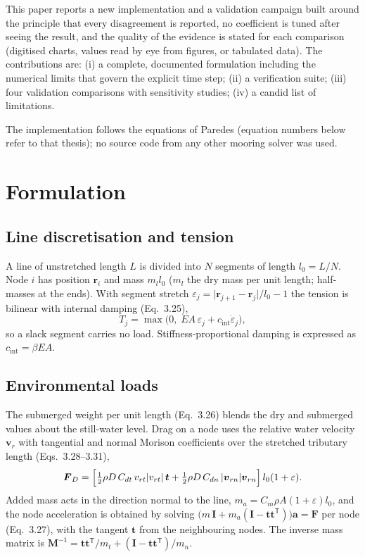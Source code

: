 \documentclass[11pt,a4paper]{article}
\newcommand{\vect}[1]{\boldsymbol{#1}}
\begin{document}
This paper reports a new implementation and a validation campaign built around the principle that every disagreement is reported, no coefficient is tuned after seeing the result, and the quality of the evidence is stated for each comparison (digitised charts, values read by eye from figures, or tabulated data). The contributions are: (i) a complete, documented formulation including the numerical limits that govern the explicit time step; (ii) a verification suite; (iii) four validation comparisons with sensitivity studies; (iv) a candid list of limitations.

The implementation follows the equations of Paredes \cite{paredes2016} (equation numbers below refer to that thesis); no source code from any other mooring solver was used.

\section{Formulation}
\subsection{Line discretisation and tension}
A line of unstretched length $L$ is divided into $N$ segments of length $l_0=L/N$. Node $i$ has position $\vect r_i$ and mass $m_l l_0$ ($m_l$ the dry mass per unit length; half-masses at the ends). With segment stretch $\varepsilon_j=\lvert\vect r_{j+1}-\vect r_j\rvert/l_0-1$ the tension is bilinear with internal damping (Eq.~3.25),
\begin{equation}
T_j=\max\!\bigl(0,\;EA\,\varepsilon_j+c_{\mathrm{int}}\dot\varepsilon_j\bigr),
\end{equation}
so a slack segment carries no load. Stiffness-proportional damping is expressed as $c_{\mathrm{int}}=\beta EA$.

\subsection{Environmental loads}
The submerged weight per unit length (Eq.~3.26) blends the dry and submerged values about the still-water level. Drag on a node uses the relative water velocity $\vect v_r$ with tangential and normal Morison coefficients over the stretched tributary length (Eqs.~3.28--3.31),
\begin{equation}
\vect F_D=\Bigl[\tfrac12\rho D\,C_{dt}\,v_{rt}\lvert v_{rt}\rvert\,\vect t+\tfrac12\rho D\,C_{dn}\,\lvert\vect v_{rn}\rvert\vect v_{rn}\Bigr]\,l_0(1+\varepsilon).
\end{equation}
Added mass acts in the direction normal to the line, $m_a=C_m\rho A(1+\varepsilon)l_0$, and the node acceleration is obtained by solving $\bigl(m\,\mathbf I+m_a(\mathbf I-\vect t\vect t^{\mathsf T})\bigr)\vect a=\vect F$ per node (Eq.~3.27), with the tangent $\vect t$ from the neighbouring nodes. The inverse mass matrix is $\mathbf M^{-1}=\vect t\vect t^{\mathsf T}/m_t+(\mathbf I-\vect t\vect t^{\mathsf T})/m_n$.
\end{document}
